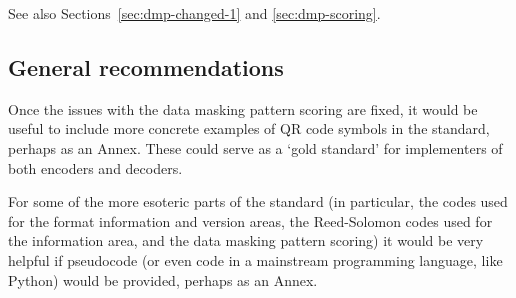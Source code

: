 \documentclass[a4paper,twoside]{article}
\begin{document}
See also Sections~\ref{sec:dmp-changed-1} and \ref{sec:dmp-scoring}.

\subsection{General recommendations}

Once the issues with the data masking pattern scoring are fixed, it would be useful to include more concrete examples
of QR code symbols in the standard, perhaps as an Annex. These could serve as a `gold standard' for implementers of both
encoders and decoders.

For some of the more esoteric parts of the standard (in particular, the codes used for the format information and version areas,
the Reed-Solomon codes used for the information area, and the data masking pattern scoring) it would be very helpful if pseudocode
(or even code in a mainstream programming language, like Python) would be provided, perhaps as an Annex.
\end{document}
